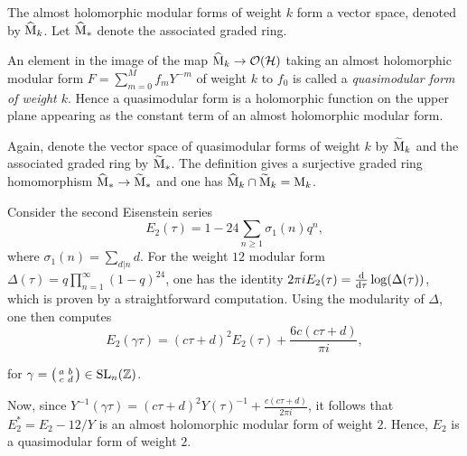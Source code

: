 The almost holomorphic modular forms of weight $k$ form a vector space, denoted by $\widehat{\mathrm{M}}_k$. Let $\widehat{\mathrm{M}}_*$ denote the associated graded ring.

\begin{defi}
 An element in the image of the map $\widehat{\mathrm{M}}_k\to\mathcal{O}(\mathcal{H})$ taking an almost holomorphic modular form $F=\sum_{m=0}^Mf_mY^{-m}$ of weight $k$ to $f_0$ is called a \emph{quasimodular form of weight $k$}. Hence a quasimodular form is a holomorphic function on the upper plane appearing as the constant term of an almost holomorphic modular form.
\end{defi}

Again, denote the vector space of quasimodular forms of weight $k$ by $\widetilde{\mathrm{M}}_k$ and the associated graded ring by $\widetilde{\mathrm{M}}_*$. The definition gives a surjective graded ring homomorphism $\widehat{\mathrm{M}}_*\to\widetilde{\mathrm{M}}_*$ and one has $\widehat{\mathrm{M}}_k \cap \widetilde{\mathrm{M}}_k = \mathrm{M}_k$.

\begin{expl}

Consider the second Eisenstein series \[E_2(\tau)=1-24\sum_{n\geq1}\sigma_1(n)q^n,\] where $\sigma_1(n)=\sum_{d|n}d$. For the weight $12$ modular form $\Delta(\tau)=q\prod_{n=1}^{\infty}(1-q)^{24}$, one has the identity $2\pi iE_2(\tau)=\frac{\mathrm{d}}{\mathrm{d}\tau}\log(\Delta(\tau))$, which is proven by a straightforward computation. Using the modularity of $\Delta$, one then computes \[E_2(\gamma\tau)=(c\tau+d)^2 E_2(\tau) + \frac{6c(c\tau+d)}{\pi i},\]

for $\gamma=
 \bigl(\begin{smallmatrix}
 a&b\\ c&d
 \end{smallmatrix} \bigr)
 \in \operatorname{SL}_n(\mathbb{Z})$.

Now, since $Y^{-1}(\gamma\tau)=(c\tau+d)^2Y(\tau)^{-1}+\frac{c(c\tau+d)}{2\pi i}$, it follows that $E_2^*=E_2-12/Y$ is an almost holomorphic modular form of weight $2$. Hence, $E_2$ is a quasimodular form of weight $2$.

\end{expl}

